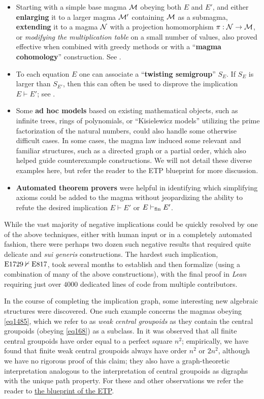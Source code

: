 \begin{itemize}
        \item Starting with a simple base magma ${\mathcal{M}}$ obeying both $E$ and $E'$, and either \textbf{enlarging} it to a larger magma ${\mathcal{M}}'$ containing ${\mathcal{M}}$ as a submagma, \textbf{extending} it to a magma ${\mathcal{N}}$ with a projection homomorphism $\pi: {\mathcal{N}} \to {\mathcal{M}}$, or \emph{modifying the multiplication table} on a small number of values, also proved effective when combined with greedy methods or with a ``\textbf{magma cohomology}'' construction. See .
        \item To each equation $E$ one can associate a ``\textbf{twisting semigroup}'' $S_E$.  If $S_E$ is larger than $S_{E'}$, then this can often be used to disprove the implication $E \vdash E'$; see .
        \item Some \textbf{ad hoc models} based on existing mathematical objects, such as infinite trees, rings of polynomials, or ``Kisielewicz models'' utilizing the prime factorization of the natural numbers, could also handle some otherwise difficult cases.  In some cases, the magma law induced some relevant and familiar structures, such as a directed graph or a partial order, which also helped guide counterexample constructions. We will not detail these diverse examples here, but refer the reader to the ETP blueprint for more discussion.
        \item \textbf{Automated theorem provers} were helpful in identifying which simplifying axioms could be added to the magma without jeopardizing the ability to refute the desired implication $E \vdash E'$ or $E \vdash_{\mathrm{fin}} E'$.
\end{itemize}

While the vast majority of negative implications could be quickly resolved by one of the above techniques, either with human input or in a completely automated fashion, there were perhaps two dozen such negative results that required quite delicate and \emph{sui generis} constructions.  The hardest such implication, $\mathrm{E}1729 \nvdash \mathrm{E}817$, took several months to establish and then formalize (using a combination of many of the above constructions), with the final proof in \emph{Lean} requiring just over $\num{4000}$ dedicated lines of code from multiple contributors.

In the course of completing the implication graph, some interesting new algebraic structures were discovered.  One such example concerns the magmas obeying \eqref{eq1485}, which we refer to as \emph{weak central groupoids} as they contain the central groupoids (obeying \eqref{eq168}) as a subclass.  In \cite{knuth} it was observed that all finite central groupoids have order equal to a perfect square $n^2$; empirically, we have found that finite weak central groupoids always have order $n^2$ or $2n^2$, although we have no rigorous proof of this claim; they also have a graph-theoretic interpretation analogous to the interpretation of central groupoids as digraphs with the unique path property.  For these and other observations we refer the reader to \href{https://teorth.github.io/equational_theories/blueprint/weak-central-groupoids-chapter.html}{the blueprint of the ETP}.

